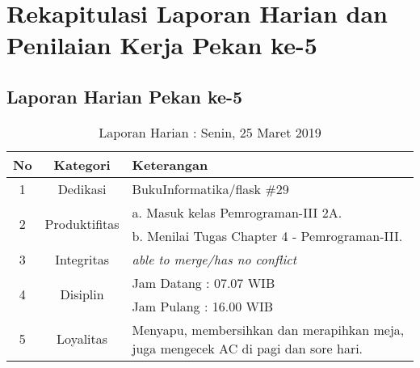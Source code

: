 \section{Rekapitulasi Laporan Harian dan Penilaian Kerja Pekan ke-5}

\subsection{Laporan Harian Pekan ke-5}

\begin{table}[htp]
\begin{center}
\caption{Laporan Harian : Senin, 25 Maret 2019}
\label{tab:lh250319}
\begin{tabularx}{\textwidth}{|l|l|X|}
\hline
\multicolumn{1}{|c|}{\textbf{No}} & \multicolumn{1}{c|}{\textbf{Kategori}} & \textbf{Keterangan} \\ \hline
\multicolumn{1}{|c|}{\multirow{1}{*}{1}} & \multicolumn{1}{c|}{\multirow{1}{*}{\parbox{2.5cm}{Dedikasi}}}
& BukuInformatika/flask \#29\\
\hline
\multicolumn{1}{|c|}{\multirow{2}{*}{2}} & \multicolumn{1}{c|}{\multirow{2}{*}{\parbox{2.5cm}{Produktifitas}}}
& a. Masuk kelas Pemrograman-III 2A.\\
\multicolumn{1}{|c|}{\multirow{1}{*}{}} & \multicolumn{1}{c|}{\multirow{1}{*}{\parbox{2.5cm}{}}}
& b. Menilai Tugas Chapter 4 - Pemrograman-III.\\
\hline
\multicolumn{1}{|c|}{\multirow{1}{*}{3}} & \multicolumn{1}{c|}{\multirow{1}{*}{\parbox{2.5cm}{Integritas}}}
& \textit{able to merge/has no conflict} \\
\hline
\multicolumn{1}{|c|}{\multirow{2}{*}{4}} & \multicolumn{1}{c|}{\multirow{2}{*}{\parbox{2.5cm}{Disiplin}}}
& Jam Datang : 07.07 WIB \\
\multicolumn{1}{|c|}{\multirow{1}{*}{}} & \multicolumn{1}{c|}{\multirow{1}{*}{\parbox{2.5cm}{}}}
& Jam Pulang : 16.00 WIB \\
\hline
\multicolumn{1}{|c|}{\multirow{2}{*}{5}} & \multicolumn{1}{c|}{\multirow{2}{*}{\parbox{2.5cm}{Loyalitas}}}
& Menyapu, membersihkan dan merapihkan meja, juga mengecek AC di pagi dan sore hari.\\
\hline
\end{tabularx}
\end{center}
\end{table}

